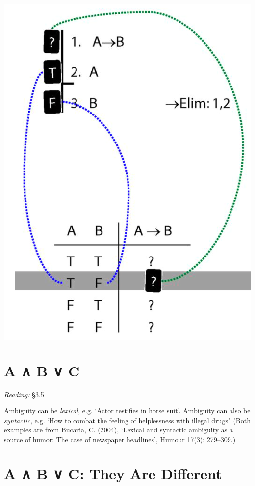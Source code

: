 \documentclass[12pt]{extarticle}
\begin{document}
\begin{multicols*}{3}
\begin{center}
\includegraphics[scale=0.3]{img/unit_700_rule_to_tt.png}
\end{center}
 
 
\section{A ∧ B ∨ C}
 
\emph{Reading:} §3.5
 
Ambiguity can be \emph{lexical}, e.g. `Actor testifies in horse suit'. Ambiguity can also be \emph{syntactic}, e.g. `How to combat the feeling of helplessness with illegal drugs'. (Both examples are from Bucaria, C. (2004), `Lexical and syntactic ambiguity as a source of humor: The case of newspaper headlines', Humour 17(3): 279--309.)
 
 
 
\section{A ∧ B ∨ C: They Are Different}
 

\end{multicols*}
\end{document}
